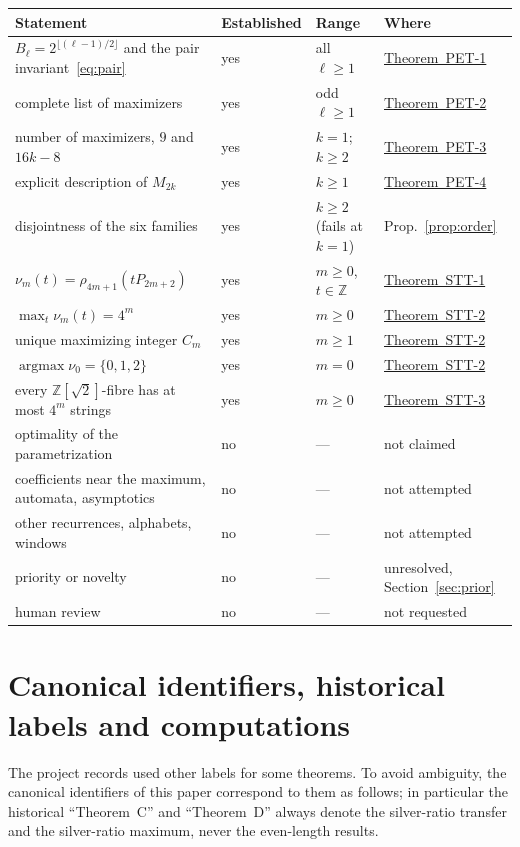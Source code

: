 \documentclass[11pt]{amsart}
\theoremstyle{definition}
\theoremstyle{remark}
\theoremstyle{plain}
\numberwithin{equation}{section}
\newcommand{\Z}{\mathbb{Z}}
\newcommand{\floor}[1]{\lfloor #1\rfloor}
\newcommand{\argmax}{\operatorname*{argmax}}
\newcommand{\PETone}{\hyperref[thm:pet1]{Theorem~PET-1}}
\newcommand{\PETtwo}{\hyperref[thm:pet2]{Theorem~PET-2}}
\newcommand{\PETthree}{\hyperref[thm:pet3]{Theorem~PET-3}}
\newcommand{\PETfour}{\hyperref[thm:pet4]{Theorem~PET-4}}
\newcommand{\STTone}{\hyperref[thm:stt1]{Theorem~STT-1}}
\newcommand{\STTtwo}{\hyperref[thm:stt2]{Theorem~STT-2}}
\newcommand{\STTthree}{\hyperref[thm:stt3]{Theorem~STT-3}}
\begin{document}
\begin{center}
\small
\begin{tabularx}{\textwidth}{@{}>{\raggedright\arraybackslash}X l l l@{}}
\toprule
Statement & Established & Range & Where\\
\midrule
$B_\ell=2^{\floor{(\ell-1)/2}}$ and the pair invariant~\eqref{eq:pair} & yes & all $\ell\ge1$ & \PETone\\
complete list of maximizers & yes & odd $\ell\ge1$ & \PETtwo\\
number of maximizers, $9$ and $16k-8$ & yes & $k=1$; $k\ge2$ & \PETthree\\
explicit description of $M_{2k}$ & yes & $k\ge1$ & \PETfour\\
disjointness of the six families & yes & $k\ge2$ (fails at $k=1$) & Prop.~\ref{prop:order}\\
$\nu_m(t)=\rho_{4m+1}(tP_{2m+2})$ & yes & $m\ge0$, $t\in\Z$ & \STTone\\
$\max_t\nu_m(t)=4^m$ & yes & $m\ge0$ & \STTtwo\\
unique maximizing integer $C_m$ & yes & $m\ge1$ & \STTtwo\\
$\argmax\nu_0=\{0,1,2\}$ & yes & $m=0$ & \STTtwo\\
every $\Z[\sqrt2]$-fibre has at most $4^m$ strings & yes & $m\ge0$ & \STTthree\\
optimality of the parametrization & no & --- & not claimed\\
coefficients near the maximum, automata, asymptotics & no & --- & not attempted\\
other recurrences, alphabets, windows & no & --- & not attempted\\
priority or novelty & no & --- & unresolved, Section~\ref{sec:prior}\\
human review & no & --- & not requested\\
\bottomrule
\end{tabularx}
\end{center}

\section{Canonical identifiers, historical labels and computations}\label{app:aliases}

The project records used other labels for some theorems. To avoid ambiguity, the canonical
identifiers of this paper correspond to them as follows; in particular the historical
``Theorem~C'' and ``Theorem~D'' always denote the silver-ratio transfer and the silver-ratio maximum,
never the even-length results.
\end{document}
